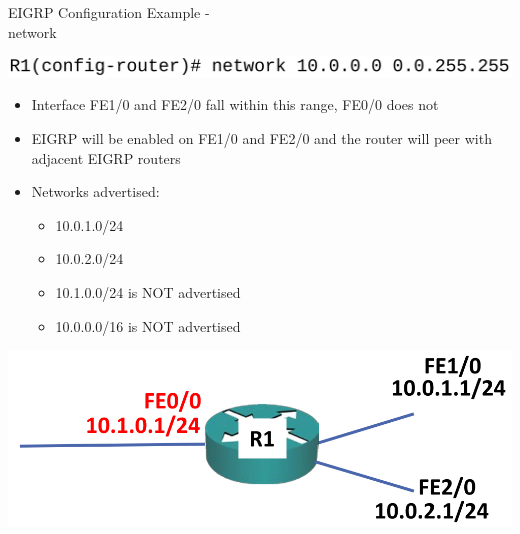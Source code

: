\documentclass[pdflatex,compress,mathserif]{beamer}
\begin{document}
\begin{frame}{EIGRP Configuration Example -\\ network}
	\begin{center}
		\includegraphics[width=0.7\linewidth]{img/img16}
	\end{center}
	\begin{itemize}
		\item Interface FE1/0 and FE2/0 fall within this range, FE0/0 does not
		\item EIGRP will be enabled on FE1/0 and FE2/0 and the router will peer with
adjacent EIGRP routers
	\end{itemize}
	\begin{multicols}{2}
		\begin{itemize}
			\item Networks advertised:
			\begin{itemize}
				\item 10.0.1.0/24
				\item 10.0.2.0/24
				\item 10.1.0.0/24 is NOT advertised
				\item 10.0.0.0/16 is NOT advertised
			\end{itemize}
		\end{itemize}
		\columnbreak
		\begin{center}
			\includegraphics[width=\linewidth]{img/img17}
		\end{center}
	\end{multicols}
\end{frame}
\end{document}
